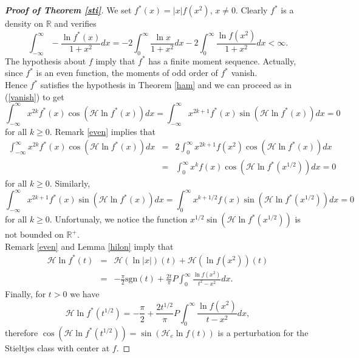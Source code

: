 \documentclass{amsart}
\newcommand{\R}{\mathbb{R}}
\newcommand{\INT}{\int_{-\infty}^{\infty}}
\begin{document}
\begin{proof}[\textbf{Proof of Theorem \ref{sti}}]
We set $f^*(x)=|x|f(x^2)$, $x \neq 0$. Clearly $f^*$ is a density on $\R$ and verifies
$$\INT-\frac{\ln f^*\left( x\right) }{1+x^{2}}dx=-2\int_0^{\infty}\frac{\ln x }{1+x^{2}}dx-2\int_0^{\infty}\frac{\ln f\left( x^2\right) }{1+x^{2}}dx<\infty .$$
The hypothesis about $f$ imply that $f^*$ has a finite moment sequence. Actually, since $f^*$ is an even function, the moments of odd order of $f^*$ vanish.\\

Hence $f^*$ satisfies the hypothesis in Theorem \ref{ham} and we can proceed as in (\ref{vanish}) to get
\begin{equation*}
\INT x^{2k} f^*(x) \cos\left( \mathcal{H}\ln f^* (x)\right) dx= \INT x^{2k+1} f^*(x) \sin\left( \mathcal{H}\ln f^* (x)\right) dx= 0
\end{equation*}
for all $k\geq 0$. Remark \ref{even} implies that
\begin{eqnarray*}
\INT x^{2k} f^*(x) \cos\left( \mathcal{H}\ln f^* (x)\right) dx&=&2\int_0^\infty x^{2k+1}f(x^2)\cos\left( \mathcal{H}\ln f^* (x)\right) dx \\
&=& \int_0^\infty x^k f(x) \cos\left( \mathcal{H}\ln f^* (x^{1/2})\right) dx=0
\end{eqnarray*}
for all $k\geq 0$. Similarly,
$$\INT x^{2k+1} f^*(x) \sin\left( \mathcal{H}\ln f^* (x)\right) dx=\int_0^\infty x^{k+1/2} f(x) \sin\left( \mathcal{H}\ln f^* (x^{1/2})\right) dx=0$$
for all $k\geq 0$. Unfortunaly, we notice the function $x^{1/2}\sin\left( \mathcal{H}\ln f^* (x^{1/2})\right)$ is not bounded on $\R^+$.\\

Remark \ref{even} and Lemma \ref{hilon} imply that
\begin{eqnarray*}
\mathcal{H}\ln f^* (t)&=&\mathcal{H}(\ln|x|)(t)+\mathcal{H}\left(\ln f(x^2)\right)(t)\\
&=& -\frac{\pi}{2} \text{sgn}(t)+\frac{2t}{\pi}P \int_0^\infty \frac{\ln f(x^2)}{t^2-x^2}dx.
\end{eqnarray*}
Finally, for $t>0$ we have
$$\mathcal{H}\ln f^* (t^{1/2})=-\frac{\pi}{2}+\frac{2t^{1/2}}{\pi}P \int_0^\infty \frac{\ln f(x^2)}{t-x^2}dx,$$
therefore $\cos\left( \mathcal{H}\ln f^*(t^{1/2})\right)=\sin(\mathcal{H}_e\ln f(t))$ is a perturbation for the Stieltjes class with center at $f$.
\end{proof} 
\end{document}

